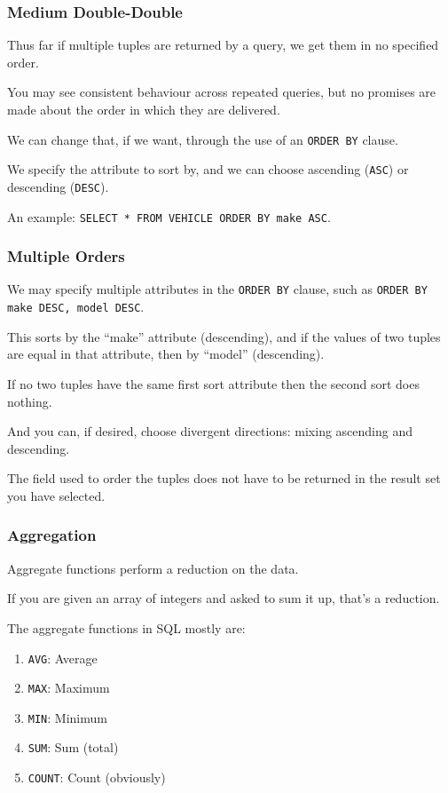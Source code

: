 \begin{frame}
\frametitle{Medium Double-Double}

Thus far if multiple tuples are returned by a query, we get them in no specified order. 

You may see consistent behaviour across repeated queries, but no promises are made about the order in which they are delivered. 

We can change that, if we want, through the use of an \texttt{ORDER BY} clause. 

We specify the attribute to sort by, and we can choose ascending (\texttt{ASC}) or descending (\texttt{DESC}). 

An example: \texttt{SELECT * FROM VEHICLE ORDER BY make ASC}.

\end{frame}



\begin{frame}
\frametitle{Multiple Orders}

We may specify multiple attributes in the \texttt{ORDER BY} clause, such as \texttt{ORDER BY make DESC, model DESC}. 

This sorts by the ``make'' attribute (descending), and if the values of two tuples are equal in that attribute, then by ``model'' (descending). 

If no two tuples have the same first sort attribute then the second sort does nothing.

And you can, if desired, choose divergent directions: mixing ascending and descending.

The field used to order the tuples does not have to be returned in the result set you have selected.


\end{frame}



\begin{frame}
\frametitle{Aggregation}

Aggregate functions perform a reduction on the data. 

If you are given an array of integers and asked to sum it up, that's a reduction. 

The aggregate functions in SQL mostly are:
\begin{enumerate}
	\item \texttt{AVG}: Average 
	\item \texttt{MAX}: Maximum
	\item \texttt{MIN}: Minimum
	\item \texttt{SUM}: Sum (total)
	\item \texttt{COUNT}: Count (obviously)
\end{enumerate}


\end{frame}



